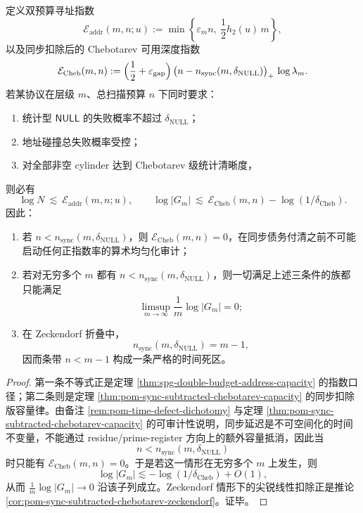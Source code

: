 \begin{theorem}[同步死区与预算不可兑换定理]\label{thm:conclusion-sync-deadzone-budget-nonexchangeability}
定义双预算寻址指数
\[
\mathcal E_{\mathrm{addr}}(m,n;u):=
\min\!\left\{\varepsilon_m n,\ \frac12 h_2(u)\,m\right\},
\]
以及同步扣除后的 Chebotarev 可用深度指数
\[
\mathcal E_{\mathrm{Cheb}}(m,n):=
\Bigl(\frac12+\varepsilon_{\mathrm{gap}}\Bigr)\,
\bigl(n-n_{\mathrm{sync}}(m,\delta_{\mathrm{NULL}})\bigr)_+\,
\log\lambda_m.
\]
若某协议在层级 \(m\)、总扫描预算 \(n\) 下同时要求：
\begin{enumerate}
\normalfont
  \item 统计型 \(\mathsf{NULL}\) 的失败概率不超过 \(\delta_{\mathrm{NULL}}\)；
  \item 地址碰撞总失败概率受控；
  \item 对全部非空 cylinder 达到 Chebotarev 级统计清晰度，
\end{enumerate}
则必有
\[
\log N\ \lesssim\ \mathcal E_{\mathrm{addr}}(m,n;u),
\qquad
\log |G_m|
\ \lesssim\
\mathcal E_{\mathrm{Cheb}}(m,n)-\log(1/\delta_{\mathrm{Cheb}}).
\]
因此：
\begin{enumerate}
\normalfont
  \item 若 \(n<n_{\mathrm{sync}}(m,\delta_{\mathrm{NULL}})\)，则 \(\mathcal E_{\mathrm{Cheb}}(m,n)=0\)，在同步债务付清之前不可能启动任何正指数率的算术均匀化审计；
  \item 若对无穷多个 \(m\) 都有 \(n<n_{\mathrm{sync}}(m,\delta_{\mathrm{NULL}})\)，则一切满足上述三条件的族都只能满足
  \[
  \limsup_{m\to\infty}\frac1m\log |G_m|=0;
  \]
  \item 在 Zeckendorf 折叠中，
  \[
  n_{\mathrm{sync}}(m,\delta_{\mathrm{NULL}})=m-1,
  \]
  因而条带 \(n<m-1\) 构成一条严格的时间死区。
\end{enumerate}
\end{theorem}
\begin{proof}
第一条不等式正是定理 \ref{thm:spg-double-budget-address-capacity} 的指数口径；第二条则是定理 \ref{thm:pom-sync-subtracted-chebotarev-capacity} 的同步扣除版容量律。由备注 \ref{rem:pom-time-defect-dichotomy} 与定理 \ref{thm:pom-sync-subtracted-chebotarev-capacity} 的可审计性说明，同步延迟是不可空间化的时间不变量，不能通过 residue/prime-register 方向上的额外容量抵消，因此当
\[
n<n_{\mathrm{sync}}(m,\delta_{\mathrm{NULL}})
\]
时只能有 \(\mathcal E_{\mathrm{Cheb}}(m,n)=0\)。于是若这一情形在无穷多个 \(m\) 上发生，则
\[
\log |G_m|\lesssim -\log(1/\delta_{\mathrm{Cheb}})+O(1),
\]
从而 \(\frac1m\log|G_m|\to 0\) 沿该子列成立。Zeckendorf 情形下的尖锐线性扣除正是推论 \ref{cor:pom-sync-subtracted-chebotarev-zeckendorf}。证毕。
\end{proof}


